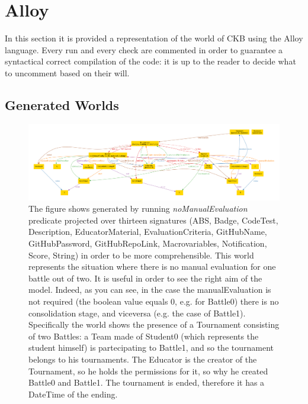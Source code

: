 \section{Alloy}
\lstset{
  language=alloy,
  basicstyle=\small\ttfamily,
  breaklines=true,
  showstringspaces=false
}
In this section it is provided a representation of the world of CKB using the Alloy language. Every run and every check are commented in order to guarantee a syntactical correct compilation of the code: it is up to the reader to decide what to uncomment based on their will.



\subsection{Generated Worlds}
\begin{figure}[h]
  \centering
  \includegraphics[width=1\linewidth]{4Alloy/res/noManualEvaluation.pdf}
  \caption{The figure shows generated by running \textit{noManualEvaluation} predicate projected over thirteen signatures (ABS, Badge, CodeTest, Description, EducatorMaterial, EvaluationCriteria, GitHubName, GitHubPassword, GitHubRepoLink, Macrovariables, Notification, Score, String) in order to be more comprehensible. This world represents the situation where there is no manual evaluation for one battle out of two. It is useful in order to see the right aim of the model. Indeed, as you can see, in the case the manualEvaluation is not required (the boolean value equals 0, e.g. for Battle0) there is no consolidation stage, and viceversa (e.g. the case of Battle1). Specifically the world shows the presence of a Tournament consisting of two Battles: a Team made of Student0 (which represents the student himself) is partecipating to Battle1, and so the tournament belongs to his tournaments. The Educator is the creator of the Tournament, so he holds the permissions for it, so why he created Battle0 and Battle1. The tournament is ended, therefore it has a DateTime of the ending. }
\end{figure}

